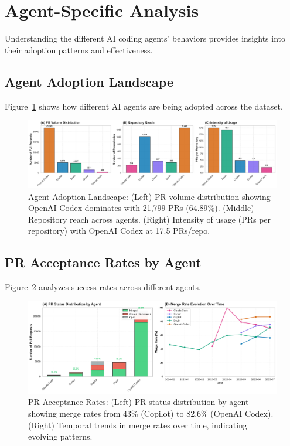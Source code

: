 \documentclass[11pt]{article}
\begin{document}
\section{Agent-Specific Analysis}

Understanding the different AI coding agents' behaviors provides insights into their adoption patterns and effectiveness.

\subsection{Agent Adoption Landscape}

Figure~\ref{fig:agent_adoption} shows how different AI agents are being adopted across the dataset.

\begin{figure}[H]
\centering
\includegraphics[width=\textwidth]{figures/fig1_agent_adoption_landscape.png}
\caption{Agent Adoption Landscape: (Left) PR volume distribution showing OpenAI Codex dominates with 21,799 PRs (64.89\%). (Middle) Repository reach across agents. (Right) Intensity of usage (PRs per repository) with OpenAI Codex at 17.5 PRs/repo.}
\label{fig:agent_adoption}
\end{figure}

\subsection{PR Acceptance Rates by Agent}

Figure~\ref{fig:pr_acceptance} analyzes success rates across different agents.

\begin{figure}[H]
\centering
\includegraphics[width=\textwidth]{figures/fig2_pr_acceptance_rates.png}
\caption{PR Acceptance Rates: (Left) PR status distribution by agent showing merge rates from 43\% (Copilot) to 82.6\% (OpenAI Codex). (Right) Temporal trends in merge rates over time, indicating evolving patterns.}
\label{fig:pr_acceptance}
\end{figure}
\end{document}
